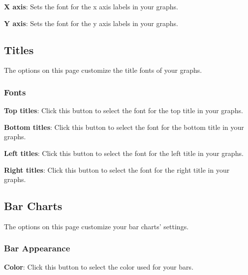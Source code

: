 \documentclass[
]{book}
\theoremstyle{definition}
\theoremstyle{definition}
\theoremstyle{definition}
\theoremstyle{definition}
\theoremstyle{remark}
\begin{document}
\textbf{X axis}: Sets the font for the x axis labels in your graphs.

\textbf{Y axis}: Sets the font for the y axis labels in your graphs.

\hypertarget{titles}{%
\subsection*{Titles}\label{titles}}

The options on this page customize the title fonts of your graphs.

\hypertarget{fonts-1}{%
\subsubsection*{Fonts}\label{fonts-1}}

\textbf{Top titles}: Click this button to select the font for the top title in your graphs.

\textbf{Bottom titles}: Click this button to select the font for the bottom title in your graphs.

\textbf{Left titles}: Click this button to select the font for the left title in your graphs.

\textbf{Right titles}: Click this button to select the font for the right title in your graphs.

\hypertarget{options-bar-charts}{%
\subsection*{Bar Charts}\label{options-bar-charts}}

The options on this page customize your bar charts' settings.

\hypertarget{bar-appearance}{%
\subsubsection*{Bar Appearance}\label{bar-appearance}}

\textbf{Color}: Click this button to select the color used for your bars.
\end{document}
